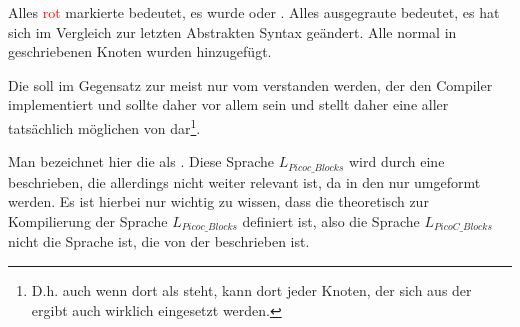 \begin{grammar}
  \toprule
  \commentsecond*
  \midrule
  \arith*
  \midrule
  \logic*
  \midrule
  \assign*
  \midrule
  \pntrshrinkafter*
  \midrule
  \arraysecond*
  \midrule
  \struct*
  \midrule
  \ifelseblocks*
  \midrule
  \loopblocks*
  \midrule
  \funafter*
  \midrule
  \block
  \midrule
  \file*
  \bottomrule
\end{grammar}

\begin{Special_Paragraph}
  Alles \textcolor{red}{rot} markierte bedeutet, es wurde  oder . Alles \textcolor{gray!90!black}{ausgegraute} bedeutet, es hat sich im Vergleich zur letzten Abstrakten Syntax  geändert. Alle normal in  geschriebenen Knoten wurden  hinzugefügt.

  Die  soll im Gegensatz zur  meist nur vom  verstanden werden, der den Compiler implementiert und sollte daher vor allem  sein und stellt daher eine  aller tatsächlich möglichen  von  dar\footnote{D.h. auch wenn dort  als  steht, kann dort  jeder Knoten, der sich aus der   ergibt auch wirklich eingesetzt werden.}.

  Man bezeichnet hier die  als . Diese Sprache $L_{Picoc\_Blocks}$ wird durch eine  beschrieben, die allerdings nicht weiter relevant ist, da in den  nur  umgeformt werden. Es ist hierbei nur wichtig zu wissen, dass die  theoretisch zur Kompilierung der Sprache $L_{Picoc\_Blocks}$ definiert ist, also die Sprache $L_{PicoC\_Blocks}$ nicht die Sprache ist, die von der  beschrieben ist.
\end{Special_Paragraph}


